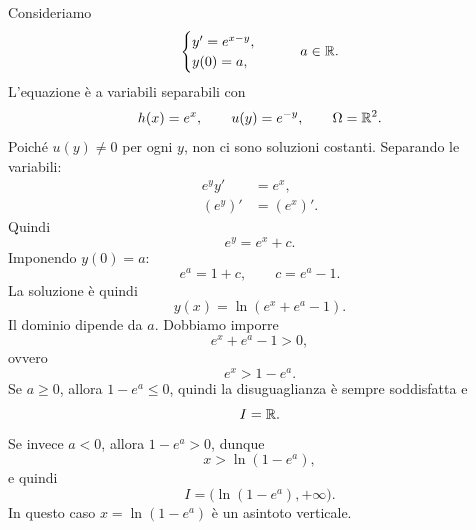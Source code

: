 \documentclass[a4paper]{article}
\begin{document}
\begin{radioactive}
\begin{snippetexample}{}
    Consideriamo
    \[
        \begin{cases}
            y'=e^{x-y},\\
            y(0)=a,
        \end{cases}
        \qquad a\in\mathbb{R}.
    \]
    L'equazione è a variabili separabili con
    \[
        h(x)=e^x,
        \qquad
        u(y)=e^{-y},
        \qquad
        \Omega=\mathbb{R}^2.
    \]
    Poiché \(u(y)\neq 0\) per ogni \(y\), non ci sono soluzioni costanti. Separando le variabili:
    \begin{align*}
        e^y y'&=e^x,\\
        (e^y)'&=(e^x)'.
    \end{align*}
    Quindi
    \[
        e^y=e^x+c.
    \]
    Imponendo \(y(0)=a\):
    \[
        e^a=1+c,
        \qquad
        c=e^a-1.
    \]
    La soluzione è quindi
    \[
        y(x)=\ln(e^x+e^a-1).
    \]
    Il dominio dipende da \(a\). Dobbiamo imporre
    \[
        e^x+e^a-1>0,
    \]
    ovvero
    \[
        e^x>1-e^a.
    \]
    Se \(a\geq 0\), allora \(1-e^a\leq 0\), quindi la disuguaglianza è sempre soddisfatta e
    \[
        I=\mathbb{R}.
    \]
    Se invece \(a<0\), allora \(1-e^a>0\), dunque
    \[
        x>\ln(1-e^a),
    \]
    e quindi
    \[
        I=\bigl(\ln(1-e^a),+\infty\bigr).
    \]
    In questo caso \(x=\ln(1-e^a)\) è un asintoto verticale.
\end{snippetexample}
\end{radioactive}
\end{document}
